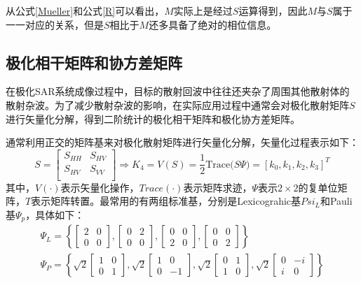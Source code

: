 从公式\ref{Mueller}和公式\ref{R}可以看出，$M$实际上是经过$S$运算得到，因此$M$与$S$属于一一对应的关系，但是$S$相比于$M$还多具备了绝对的相位信息。

\subsection{极化相干矩阵和协方差矩阵}
在极化SAR系统成像过程中，目标的散射回波中往往还夹杂了周围其他散射体的散射杂波。为了减少散射杂波的影响，在实际应用过程中通常会对极化散射矩阵$S$进行矢量化分解，得到二阶统计的极化相干矩阵和极化协方差矩阵。

通常利用正交的矩阵基来对极化散射矩阵进行矢量化分解，矢量化过程表示如下：
\begin{equation}
    S=\left[ \begin{matrix}
            S_{HH} & S_{HV} \\
            S_{HV} & S_{VV} \\
        \end{matrix} \right] \Rightarrow K_4=V(S)=\frac{1}{2}\mathrm{Trace(}S\Psi )=\left[ k_0,k_1,k_2,k_3 \right] ^T
\end{equation}
其中，$V(\cdot)$表示矢量化操作，$Trace(\cdot)$表示矩阵求迹，$\Psi$表示$2\times2$的复单位矩阵，$T$表示矩阵转置。最常用的有两组标准基，分别是Lexicograhic基$Psi_L$和Pauli基$\Psi_p$，具体如下：
\begin{gather}
    \Psi_L=\left\{\left[\begin{array}{ll}
            2 & 0 \\
            0 & 0
        \end{array}\right],\left[\begin{array}{ll}
            0 & 2 \\
            0 & 0
        \end{array}\right],\left[\begin{array}{ll}
            0 & 0 \\
            2 & 0
        \end{array}\right],\left[\begin{array}{ll}
            0 & 0 \\
            0 & 2
        \end{array}\right]\right\}                                    \\
    \Psi_P=\left\{\sqrt{2}\left[\begin{array}{ll}
            1 & 0 \\
            0 & 1
        \end{array}\right], \sqrt{2}\left[\begin{array}{cc}
            1 & 0  \\
            0 & -1
        \end{array}\right], \sqrt{2}\left[\begin{array}{ll}
            0 & 1 \\
            1 & 0
        \end{array}\right], \sqrt{2}\left[\begin{array}{cc}
            0 & -i \\
            i & 0
        \end{array}\right]\right\}
\end{gather}

